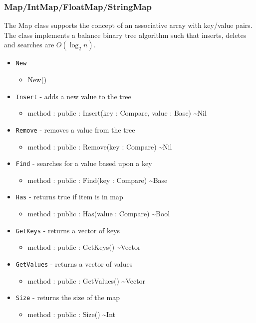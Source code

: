 \documentclass[11pt]{article}
\begin{document}
\subsubsection{Map/IntMap/FloatMap/StringMap}
The Map class supports the concept of an associative array with
key/value pairs.  The class implements a balance binary tree algorithm
such that inserts, deletes and searches are $O(\log_2 n)$.
\begin{itemize}
\item \texttt{New}
  \begin{itemize}
  \item New()
  \end{itemize}
\item \texttt{Insert} - adds a new value to the tree
  \begin{itemize}
  \item method : public : Insert(key : Compare, value : Base) \textasciitilde Nil
  \end{itemize}
\item \texttt{Remove} - removes a value from the tree
  \begin{itemize}
  \item method : public : Remove(key : Compare) \textasciitilde Nil
  \end{itemize}
\item \texttt{Find} - searches for a value based upon a key
  \begin{itemize}
  \item method : public : Find(key : Compare) \textasciitilde Base
  \end{itemize}
\item \texttt{Has} - returns true if item is in map
  \begin{itemize}
  \item method : public : Has(value : Compare) \textasciitilde Bool
  \end{itemize}

\item \texttt{GetKeys} - returns a vector of keys
  \begin{itemize}
  \item method : public : GetKeys() \textasciitilde Vector
  \end{itemize}

\item \texttt{GetValues} - returns a vector of values
  \begin{itemize}
  \item method : public : GetValues() \textasciitilde Vector
  \end{itemize}

\item \texttt{Size} - returns the size of the map
  \begin{itemize}
  \item method : public : Size() \textasciitilde Int
  \end{itemize}
\end{itemize}
\end{document}

